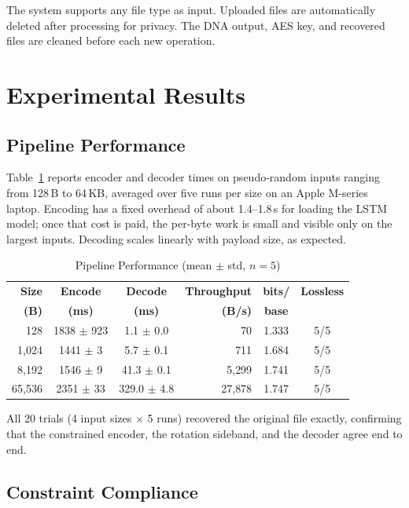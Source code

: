 \documentclass[conference]{IEEEtran}
\begin{document}
The system supports any file type as input. Uploaded files are automatically deleted after processing for privacy. The DNA output, AES key, and recovered files are cleaned before each new operation.

\section{Experimental Results}

\subsection{Pipeline Performance}

Table~\ref{tab:performance} reports encoder and decoder times on pseudo-random inputs ranging from 128\,B to 64\,KB, averaged over five runs per size on an Apple M-series laptop. Encoding has a fixed overhead of about 1.4--1.8\,s for loading the LSTM model; once that cost is paid, the per-byte work is small and visible only on the largest inputs. Decoding scales linearly with payload size, as expected.

\begin{table}[htbp]
\caption{Pipeline Performance (mean $\pm$ std, $n=5$)}
\begin{center}
\begin{tabular}{|r|c|c|r|c|c|}
\hline
\textbf{Size} & \textbf{Encode} & \textbf{Decode} & \textbf{Throughput} & \textbf{bits/} & \textbf{Lossless} \\
\textbf{(B)} & \textbf{(ms)} & \textbf{(ms)} & \textbf{(B/s)} & \textbf{base} & \\
\hline
128    & 1838 $\pm$ 923 & 1.1 $\pm$ 0.0 &     70 & 1.333 & 5/5 \\
\hline
1{,}024  & 1441 $\pm$ 3   & 5.7 $\pm$ 0.1 &    711 & 1.684 & 5/5 \\
\hline
8{,}192  & 1546 $\pm$ 9   & 41.3 $\pm$ 0.1 & 5{,}299 & 1.741 & 5/5 \\
\hline
65{,}536 & 2351 $\pm$ 33  & 329.0 $\pm$ 4.8 & 27{,}878 & 1.747 & 5/5 \\
\hline
\end{tabular}
\label{tab:performance}
\end{center}
\end{table}

All 20 trials (4 input sizes $\times$ 5 runs) recovered the original file exactly, confirming that the constrained encoder, the rotation sideband, and the decoder agree end to end.

\subsection{Constraint Compliance}
\end{document}
